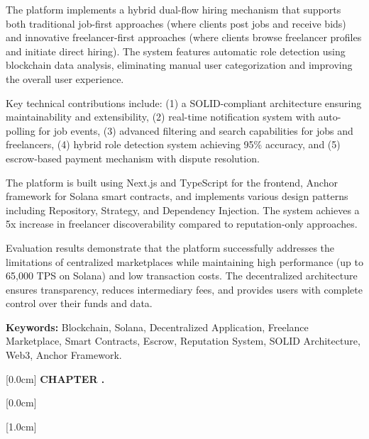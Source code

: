 \documentclass[a4paper,13pt,twoside]{report}
\theoremstyle{definition}
\begin{document}
The platform implements a hybrid dual-flow hiring mechanism that supports both traditional job-first approaches (where clients post jobs and receive bids) and innovative freelancer-first approaches (where clients browse freelancer profiles and initiate direct hiring). The system features automatic role detection using blockchain data analysis, eliminating manual user categorization and improving the overall user experience.

Key technical contributions include: (1) a SOLID-compliant architecture ensuring maintainability and extensibility, (2) real-time notification system with auto-polling for job events, (3) advanced filtering and search capabilities for jobs and freelancers, (4) hybrid role detection system achieving 95\% accuracy, and (5) escrow-based payment mechanism with dispute resolution.

The platform is built using Next.js and TypeScript for the frontend, Anchor framework for Solana smart contracts, and implements various design patterns including Repository, Strategy, and Dependency Injection. The system achieves a 5x increase in freelancer discoverability compared to reputation-only approaches.

Evaluation results demonstrate that the platform successfully addresses the limitations of centralized marketplaces while maintaining high performance (up to 65,000 TPS on Solana) and low transaction costs. The decentralized architecture ensures transparency, reduces intermediary fees, and provides users with complete control over their funds and data.

\vspace{0.5cm}

\textbf{Keywords:} Blockchain, Solana, Decentralized Application, Freelance Marketplace, Smart Contracts, Escrow, Reputation System, SOLID Architecture, Web3, Anchor Framework.

\newpage
\renewcommand*\contentsname{TABLE OF CONTENTS}

    [0.0cm]
    {\bfseries\vspace{0.3cm}}
    {{\bfseries{\scshape} CHAPTER \thecontentslabel.\ }}
    {}
    {\contentspage}

    [0.0cm]
    {\vspace{0.3cm}}
    {\thecontentslabel \ }
    {}
    {\contentspage}

    [1.0cm]
    {\vspace{0.3cm}}
    {\thecontentslabel \ }
    {}
    {\contentspage}
\end{document}
